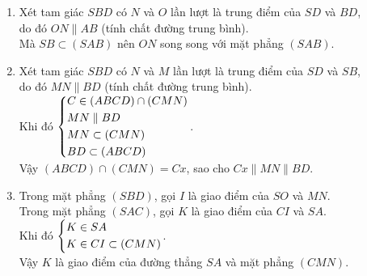 \begin{bt}
{	\begin{enumerate}
		\item Xét tam giác $SBD$ có $N$ và $O$ lần lượt là trung điểm của $SD$ và $BD$, \\ 
		do đó $ON\parallel AB$ (tính chất đường trung bình).\\
		Mà $SB\subset (SAB)$ nên $ON$ song song với mặt phẳng $(SAB)$.
		\item Xét tam giác $SBD$ có $N$ và $M$ lần lượt là trung điểm của $SD$ và $SB$,\\
		do đó $MN\parallel BD$ (tính chất đường trung bình).\\
		Khi đó $\left\{\begin{aligned}&C\in (ABCD)\cap (CMN)\\&MN\parallel BD\\&MN\subset (CMN)\\&BD\subset (ABCD)\end{aligned}\right.$.\\
		Vậy $(ABCD)\cap (CMN)=Cx$, sao cho $Cx\parallel MN\parallel BD$.
		\item Trong mặt phẳng $(SBD)$, gọi $I$ là giao điểm của $SO$ và $MN$.\\
		Trong mặt phẳng $(SAC)$, gọi $K$ là giao điểm của $CI$ và $SA$.\\
		Khi đó $\left\{\begin{aligned}&K\in SA\\&K\in CI\subset (CMN)\end{aligned}\right.$.\\
		Vậy $K$ là giao điểm của đường thẳng $SA$ và mặt phẳng $(CMN)$.
	\end{enumerate}
	}
\end{bt}



